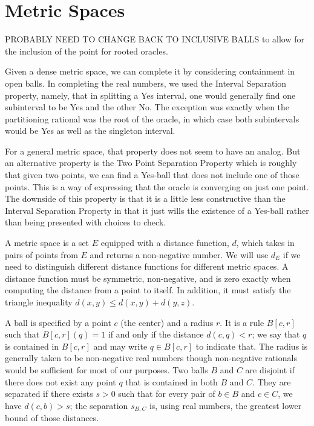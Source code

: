 \documentclass[12pt]{article}
\begin{document}
 
\section{Metric Spaces}

PROBABLY NEED TO CHANGE BACK TO INCLUSIVE BALLS to allow for the inclusion of the point for rooted oracles. 

Given a dense metric space, we can complete it by considering containment in open balls. In completing the real numbers, we used the Interval Separation property, namely, that in splitting a Yes interval, one would generally find one subinterval to be Yes and the other No. The exception was exactly when the partitioning rational was the root of the oracle, in which case both subintervals would be Yes as well as the singleton interval. 

For a general metric space, that property does not seem to have an analog. But an alternative property is the Two Point Separation Property which is roughly that given two points, we can find a Yes-ball that does not include one of those points. This is a way of expressing that the oracle is converging on just one point. The downside of this property is that it is a little less constructive than the Interval Separation Property in that it just wills the existence of a Yes-ball rather than being presented with choices to check.

A metric space is a set $E$ equipped with a distance function, $d$, which takes in pairs of points from $E$ and returns a non-negative number. We will use $d_E$ if we need to distinguish different distance functions for different metric spaces. A distance function must be symmetric, non-negative, and is zero exactly when computing the distance from a point to itself. In addition, it must satisfy the triangle inequality $d(x,y) \leq d(x,y) + d(y,z)$. 

A ball is specified by a point $c$ (the center) and a radius $r$. It is a rule $B[c,r]$ such that $B[c,r](q) = 1$ if and only if the distance $d(c,q) < r$; we say that $q$ is contained in $B[c,r]$ and may write $q \in B[c,r]$ to indicate that. The radius is generally taken to be non-negative real numbers though non-negative rationals would be sufficient for most of our purposes.  Two balls $B$ and $C$ are disjoint if there does not exist any point $q$ that is contained in both $B$ and $C$. They are separated if there exists $s> 0$ such that for every pair of $b \in B$ and $c \in C$, we have $d(c,b) > s$; the separation $s_{B,C}$ is, using real numbers, the greatest lower bound of those distances.
\end{document}
